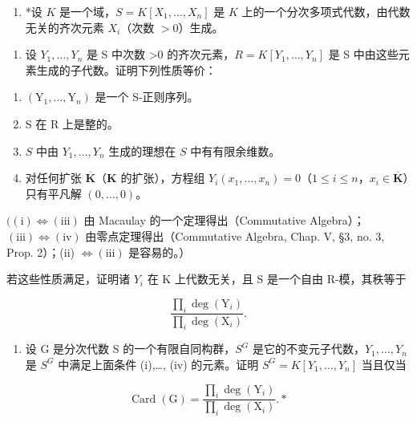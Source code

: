 \begin{enumerate}
\def\labelenumi{\arabic{enumi})}
\setcounter{enumi}{4}
\tightlist
\item
  *设 \(K\) 是一个域，\(S = K[X_1, \ldots, X_n]\) 是 \(K\) 上的一个分次多项式代数，由代数无关的齐次元素 \(X_i\)（次数 \(> 0\)）生成。
\end{enumerate}

\begin{enumerate}
\def\labelenumi{\alph{enumi})}
\tightlist
\item
  设 \(Y_{1},\ldots,Y_{n}\) 是 S 中次数 \textgreater0 的齐次元素，\(R = K[Y_{1},\ldots,Y_{n}]\) 是 S 中由这些元素生成的子代数。证明下列性质等价：
\end{enumerate}

\begin{enumerate}
\def\labelenumi{(\roman{enumi})}
\item
  \((\mathrm{Y}_1,\dots ,\mathrm{Y}_n)\) 是一个 S-正则序列。
\item
  S 在 R 上是整的。
\item
  \(S\) 中由 \(Y_{1},\ldots ,Y_{n}\) 生成的理想在 \(S\) 中有有限余维数。
\item
  对任何扩张 \(\overline{\mathbf{K}}\)（\(\mathbf{K}\) 的扩张），方程组 \(Y_{i}(x_{1},\ldots ,x_{n}) = 0\)（\(1\leqslant i\leqslant n\)，\(x_{i}\in \overline{\mathbf{K}}\)）只有平凡解 \((0,\dots ,0)\)。
\end{enumerate}

\(((\mathrm{i}) \Longleftrightarrow (\mathrm{iii})\) 由 Macaulay 的一个定理得出（Commutative Algebra）；\((\mathrm{iii}) \Longleftrightarrow (\mathrm{iv})\) 由零点定理得出（Commutative Algebra, Chap. V, §3, no. 3, Prop. 2）；(ii) \(\Longleftrightarrow (\mathrm{iii})\) 是容易的。）

若这些性质满足，证明诸 \(Y_{i}\) 在 K 上代数无关，且 S 是一个自由 R-模，其秩等于

\[
\frac {\prod_ {i} \deg (\mathrm{Y} _ {i})}{\prod_ {i} \deg (\mathrm{X} _ {i})}.
\]

\begin{enumerate}
\def\labelenumi{\alph{enumi})}
\setcounter{enumi}{1}
\tightlist
\item
  设 G 是分次代数 S 的一个有限自同构群，\(S^{G}\) 是它的不变元子代数，\(Y_{1},\ldots,Y_{n}\) 是 \(S^{G}\) 中满足上面条件 (i),\ldots, (iv) 的元素。证明 \(S^{G}=K[Y_{1},\ldots,Y_{n}]\) 当且仅当
\end{enumerate}

\[
\operatorname{Card} (\mathrm{G}) = \frac {\prod_ {i} \deg \left(\mathrm{Y} _ {i}\right)}{\prod_ {i} \deg \left(\mathrm{X} _ {i}\right)}. *
\]

